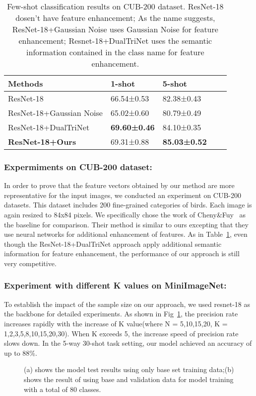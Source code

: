\documentclass[runningheads]{llncs}
\begin{document}
\begin{table}
\caption{Few-shot classification results on CUB-200 dataset. ResNet-18 dosen't have feature enhancement; As the name suggests, ResNet-18+Gaussian Noise uses Gaussian Noise for feature enhancement; Resnet-18+DualTriNet uses the semantic information contained in the class name for feature enhancement.}\label{tab2}
\centering
\begin{tabular}{|l|l|l|l|l|}
\hline
Methods & 1-shot & 5-shot\\
\hline
ResNet-18 &66.54±0.53  &82.38±0.43\\
ResNet-18+Gaussian Noise  &65.02±0.60 & 80.79±0.49\\
ResNet-18+DualTriNet & \bfseries69.60±0.46 & 84.10±0.35\\
\bfseries ResNet-18+Ours & 69.31±0.88 & \bfseries85.03±0.52\\
\hline
\end{tabular}
\end{table}


\subsubsection{Expermiments on CUB-200 dataset:}
In order to prove that the feature vectors obtained by our method are more representative for the input images, we conducted an experiment on CUB-200 datasets. This dataset includes 200 fine-grained categories of birds. Each image is again resized to 84x84 pixels. We specifically chose the work of Cheny\&Fuy~\cite{cheny2019multi} as the baseline for comparison. Their method is similar to ours excepting that they use neural networks for additional enhancement of features. As in Table~\ref{tab2}, even though the ResNet-18+DualTriNet approach apply additional semantic information for feature enhancement, the performance of our approach is still very competitive.
\subsubsection{Experiment with different K values on MiniImageNet:}
To establish the impact of the sample size on our approach, we used resnet-18 as the backbone for detailed experiments. As shown in Fig~\ref{fig1}, the precision rate increases rapidly with the increase of K value(where N = 5,10,15,20, K = 1,2,3,5,8,10,15,20,30). When K exceeds 5, the increase speed of precision rate slows down. In the 5-way 30-shot task setting, our model achieved an accuracy of up to 88\%.
\begin{figure}[htbp]
 \centering
\caption{(a) shows the model test results using only base set training data;(b) shows the result of using base and validation data for model training with a total of 80 classes.}
\label{fig1}
\end{figure}
\end{document}
